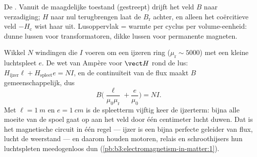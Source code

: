 \begin{omfigure}

{\small De . Vanuit de maagdelijke toestand (gestreept) drijft het
veld $B$ naar verzadiging; $H$ naar nul terugbrengen laat de
 $B_{\text{r}}$ achter, en alleen het coërcitieve veld
$-H_{\text{c}}$ wist haar uit. Lusoppervlak = warmte per cyclus per
volume-eenheid: dunne lussen voor transformatoren, dikke lussen voor permanente
magneten.}
\end{omfigure}

\begin{example}\label{ex:b3:electromagnetism-in-matter:electromagnet}
Wikkel $N$ windingen die $I$ voeren om een ijzeren ring ($\mu_{\text{r}}
\sim 5000$) met een kleine luchtspleet $e$. De wet van Ampère voor $\vect H$
rond de lus: $H_{\text{ijzer}}\ell + H_{\text{spleet}}e = NI$, en
de continuïteit van de flux maakt $B$ gemeenschappelijk, dus
\[
B\Big(\frac{\ell}{\mu_0\mu_{\text{r}}} + \frac{e}{\mu_0}\Big) = NI .
\]
Met $\ell = \qty{1}{m}$ en $e = \qty{1}{cm}$ is de spleetterm
vijftig keer de ijzerterm: bijna alle moeite van de spoel gaat op aan
het veld door één centimeter lucht duwen. Dat is het magnetische
circuit in één regel --- ijzer is een bijna perfecte geleider van flux,
lucht de weerstand --- en daarom houden motoren, relais en schroothijsers
hun luchtspleten meedogenloos dun
(\cref{pb:b3:electromagnetism-in-matter:1}).
\end{example}

